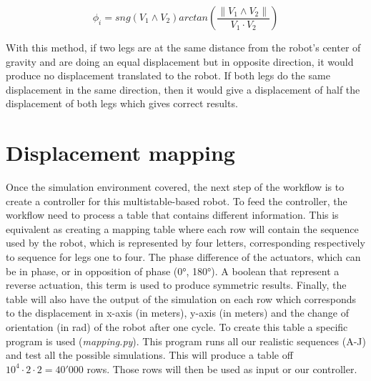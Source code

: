             \begin{equation}
                \phi_i = sng(V_1 \wedge V_2) arctan\left(\frac{\lVert V_1 \wedge V_2 \rVert}{V_1 \cdot V_2}\right)
                \label{eq:vector_angle}
            \end{equation}
            
            With this method, if two legs are at the same distance from the robot's center of gravity and are doing an equal displacement but in opposite direction, it would produce no displacement translated to the robot. If both legs do the same displacement in the same direction, then it would give a displacement of half the displacement of both legs which gives correct results.

    \section{Displacement mapping}
        Once the simulation environment covered, the next step of the workflow is to create a controller for this multistable-based robot. To feed the controller, the workflow need to process a table that contains different information. This is equivalent as creating a mapping table where each row will contain the sequence used by the robot, which is represented by four letters, corresponding respectively to sequence for legs one to four. The phase difference of the actuators, which can be in phase, or in opposition of phase (0°, 180°). A boolean that represent a reverse actuation, this term is used to produce symmetric results. Finally, the table will also have the output of the simulation on each row which corresponds to the displacement in x-axis (in meters), y-axis (in meters) and the change of orientation (in rad) of the robot after one cycle. 
        To create this table a specific program is used (\textit{mapping.py}). This program runs all our realistic sequences (A-J) and test all the possible simulations. This will produce a table off $10^4 \cdot 2 \cdot 2 = 40'000$ rows. Those rows will then be used as input or our controller.
        
